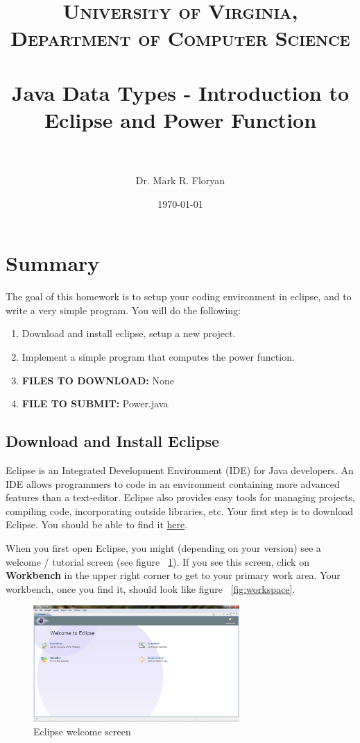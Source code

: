 \documentclass[paper=a4, fontsize=11pt, parskip=full]{scrartcl} %
\title{	
\normalfont \normalsize 
\textsc{University of Virginia, Department of Computer Science} \\ [25pt] %
\horrule{0.5pt} \\[0.4cm] %
\huge Java Data Types - Introduction to Eclipse and Power Function \\ %
\horrule{2pt} \\[0.5cm] %
}
\author{Dr. Mark R. Floryan} %
\date{\normalsize\today} %
\numberwithin{equation}{section} %
\numberwithin{figure}{section} %
\numberwithin{table}{section} %
\begin{document}
\maketitle %


\section{Summary}

The goal of this homework is to setup your coding environment in eclipse, and to write a very simple program. You will do the following:

\begin{enumerate}
	\item Download and install eclipse, setup a new project.
	\item Implement a simple program that computes the power function.
	\item \textbf{FILES TO DOWNLOAD:} None
	\item \textbf{FILE TO SUBMIT:} Power.java
\end{enumerate}


\subsection{Download and Install Eclipse}

Eclipse is an Integrated Development Environment (IDE) for Java developers. An IDE allows programmers to code in an environment containing more advanced features than a text-editor. Eclipse also provides easy tools for managing projects, compiling code, incorporating outside libraries, etc. Your first step is to download Eclipse. You should be able to find it \href{https://www.eclipse.org/downloads/}{here}.

When you first open Eclipse, you might (depending on your version) see a welcome / tutorial screen (see figure ~\ref{fig:welcome}). If you see this screen, click on \textbf{Workbench} in the upper right corner to get to your primary work area. Your workbench, once you find it, should look like figure ~\ref{fig:workspace}.

\begin{figure}[H]
\centering
\includegraphics[width=0.7\textwidth]{images/eclipse_welcome.png}
\caption{Eclipse welcome screen}
\label{fig:welcome}
\end{figure}
\end{document}

